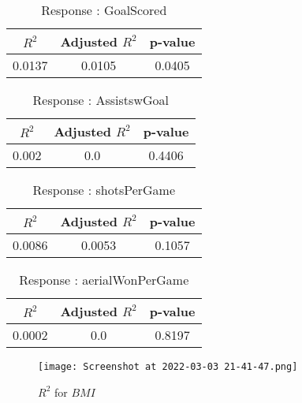 \documentclass[12pt]{article}
\begin{document}
\begin{minipage}{0.5\textwidth}
	\begin{table}[H]
	\centering
	\caption{Response : GoalScored}\label{table:1a}
	{\begin{tabular}{|c|c|c|}
			\hline
			$ R^2 $ & Adjusted $ R^2 $ & p-value \\
			\hline
			0.0137 & 0.0105 & 0.0405 \\
			\hline
		\end{tabular}
	}
\end{table}
\begin{table}[H]
	\centering
	\caption{Response : AssistswGoal}\label{table:1a}
	{\begin{tabular}{|c|c|c|}
			\hline
			$ R^2 $ & Adjusted $ R^2 $ & p-value \\
			\hline
			0.002 & 0.0 & 0.4406 \\
			\hline
		\end{tabular}
	}
\end{table}
\end{minipage}
\hfill
\begin{minipage}{0.5\textwidth}
	\begin{table}[H]
	\centering
	\caption{Response : shotsPerGame }\label{table:1a}
	{\begin{tabular}{|c|c|c|}
			\hline
			$ R^2 $ & Adjusted $ R^2 $ & p-value \\
			\hline
			0.0086 & 0.0053 & 0.1057 \\
			\hline
		\end{tabular}
	}
\end{table}
\begin{table}[H]
	\centering
	\caption{Response : aerialWonPerGame}\label{table:1a}
	{\begin{tabular}{|c|c|c|}
			\hline
			$ R^2 $ & Adjusted $ R^2 $ & p-value \\
			\hline
			0.0002 & 0.0 & 0.8197 \\
			\hline
		\end{tabular}
	}
\end{table}
\end{minipage}

\begin{figure}[H]
	\centering
	\texttt{[image: Screenshot at 2022-03-03 21-41-47.png]}
	\caption{$ R^2 $ for $ BMI $}
	\label{fig:1}
\end{figure}
\end{document}
